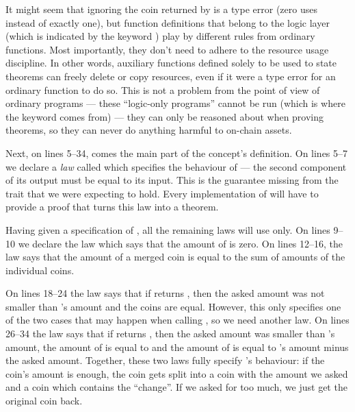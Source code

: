 It might seem that  ignoring the coin returned by  is a type error (zero uses instead of exactly one), but function definitions that belong to the logic layer (which is indicated by the keyword ) play by different rules from ordinary functions. Most importantly, they don't need to adhere to the resource usage discipline. In other words, auxiliary functions defined solely to be used to state theorems can freely delete or copy resources, even if it were a type error for an ordinary function to do so. This is not a problem from the point of view of ordinary programs --- these ``logic-only programs'' cannot be run (which is where the  keyword comes from) --- they can only be reasoned about when proving theorems, so they can never do anything harmful to on-chain assets.

Next, on lines 5--34, comes the main part of the concept's definition. On lines 5--7 we declare a \textit{law} called  which specifies the behaviour of  --- the second component of its output must be equal to its input. This is the guarantee missing from the  trait that we were expecting to hold. Every implementation of  will have to provide a proof that turns this law into a theorem.

Having given a specification of , all the remaining laws will use  only. On lines 9--10 we declare the law  which says that the amount of  is zero. On lines 12--16, the law  says that the amount of a merged coin is equal to the sum of amounts of the individual coins.

On lines 18--24 the law  says that if  returns , then the asked amount was not smaller than 's amount and the coins are equal. However, this only specifies one of the two cases that may happen when calling , so we need another law. On lines 26--34 the law  says that if  returns , then the asked amount was smaller than 's amount, the amount of  is equal to  and the amount of  is equal to 's amount minus the asked amount. Together, these two laws fully specify 's behaviour: if the coin's amount is enough, the coin gets split into a coin with the amount we asked and a coin which contains the ``change''. If we asked for too much, we just get the original coin back.

